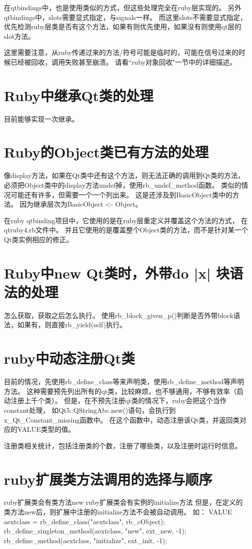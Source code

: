 在qtbindings中，也是使用类似的方式，但这些处理完全在ruby层实现的。
另外qtbindings中，slots需要显式指定，与signals一样。
而这里slots不需要显式指定，优先检测ruby层类是否有这个方法，如果有则优先使用，如果没有则使用qt层的slot方法。

这里需要注意，从ruby传递过来的方法/符号可能是临时的，可能在信号过来的时候已经被回收，调用失败甚至崩溃。
请看“ruby对象回收"一节中的详细描述。

\section{Ruby中继承Qt类的处理}
目前能够实现一次继承。

\section{Ruby的Object类已有方法的处理}
像display方法，如果在Qt类中还有这个方法，则无法正确的调用到Qt类的方法，
必须把Object类中的display方法undef掉，使用rb\_undef\_method函数。
类似的情况可能还有许多，但需要一个一个列出来。
这是还涉及到BasicObject类中的方法。
因为继承层次为BasicObject <- Object。

在ruby qtbinding项目中，它使用的是在ruby层重定义并覆盖这个方法的方式，
在qtruby4.rb文件中。
并且它使用的是覆盖整个Object类的方法，而不是针对某一个Qt类实例相应的修正。

\section{Ruby中new Qt类时，外带do |x| 块语法的处理}
怎么获取，获取之后怎么执行。
使用rb\_block\_given\_p()判断是否外带block语法，如果有，则直接rb\_yield(self)执行。

\section{ruby中动态注册Qt类}
目前的情况，先使用rb\_define\_class等来声明类，使用rb\_define\_method等声明方法。
这种需要预先列出所有的qt类，比较麻烦，也不够通用，不够有效率（启动注册上千个类）。
但是，在不预先注册qt类的情况下，ruby会把这个当作constant处理，
如Qt5::QStringAbc.new()语句，会执行到x\_Qt\_Constant\_missing函数中。
在这个函数中，动态注册该Qt类，并返回类对应的VALUE类型的值。

注册类相关统计，包括注册类的个数，注册了哪些类，以及注册时运行时信息。

\section{ruby扩展类方法调用的选择与顺序}
ruby扩展类会有类方法new
ruby扩展类会有实例的initialize方法
但是，在定义的类方法new后，则扩展中注册的initialize方法不会被自动调用。
如：
VALUE aextclass = rb\_define\_class("aextclass", rb\_cObject);
rb\_define\_singleton\_method(aextclass, "new", ext\_new, -1);
rb\_define\_method(aextclass, "initialize", ext\_init, -1);

